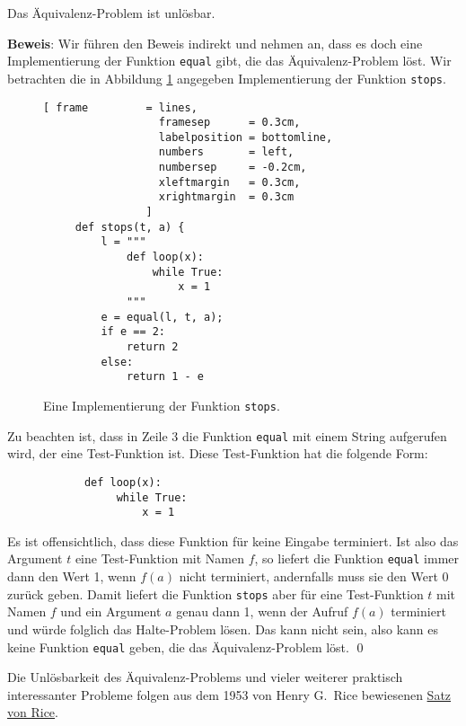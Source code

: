 \begin{Theorem}[Rice, 1953]
Das Äquivalenz-Problem ist unlösbar.  
\end{Theorem}

\noindent
\textbf{Beweis}:
Wir führen den Beweis indirekt und nehmen
an, dass es doch eine Implementierung der Funktion \texttt{equal} gibt, die das
Äquivalenz-Problem löst.  Wir betrachten die in Abbildung 
\ref{fig:stops} angegeben Implementierung der Funktion \texttt{stops}.


\begin{figure}[!h]
  \centering
\begin{Verbatim}[ frame         = lines, 
                  framesep      = 0.3cm, 
                  labelposition = bottomline,
                  numbers       = left,
                  numbersep     = -0.2cm,
                  xleftmargin   = 0.3cm,
                  xrightmargin  = 0.3cm
                ]
     def stops(t, a) {
         l = """
             def loop(x): 
                 while True:
                     x = 1
             """ 
         e = equal(l, t, a);
         if e == 2:
             return 2
         else:
             return 1 - e
\end{Verbatim}
  \vspace*{-0.3cm}
  \caption{Eine Implementierung der Funktion \texttt{stops}.}
  \label{fig:stops}
\end{figure}

Zu beachten ist, dass in Zeile 3 die Funktion \texttt{equal} mit einem String aufgerufen
wird, der eine Test-Funktion ist.  Diese 
Test-Funktion hat die
folgende Form:
\begin{verbatim}
            def loop(x): 
                 while True:
                     x = 1
\end{verbatim}
Es ist offensichtlich, dass diese Funktion für keine Eingabe terminiert.
Ist also das Argument $t$ eine Test-Funktion mit Namen $f$, so liefert die Funktion
\texttt{equal} immer dann den Wert 1, 
wenn $f(a)$ nicht terminiert, andernfalls muss sie den Wert 0 zurück geben.
Damit liefert die Funktion \texttt{stops} aber für eine Test-Funktion $t$ mit Namen $f$
und ein Argument $a$ genau dann 1, wenn der Aufruf $f(a)$ terminiert und würde folglich das Halte-Problem
lösen.  Das kann nicht sein, also kann es keine Funktion  \texttt{equal}
geben, die das Äquivalenz-Problem löst. 
\qed
\vspace*{0.3cm}

\noindent
Die Unlösbarkeit des Äquivalenz-Problems und vieler weiterer praktisch interessanter
Probleme folgen aus dem 1953 von Henry G.~Rice \cite{rice:53} bewiesenen
\href{http://de.wikipedia.org/wiki/Satz_von_Rice}{Satz von Rice}.

